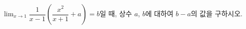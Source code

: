 $\displaystyle\lim_{x\to 1}\dfrac{1}{x-1}\left(\dfrac{x^2}{x+1}+a\right)=b$일 때, 상수 $a$, $b$에 대하여 $b-a$의 값을 구하시오.

